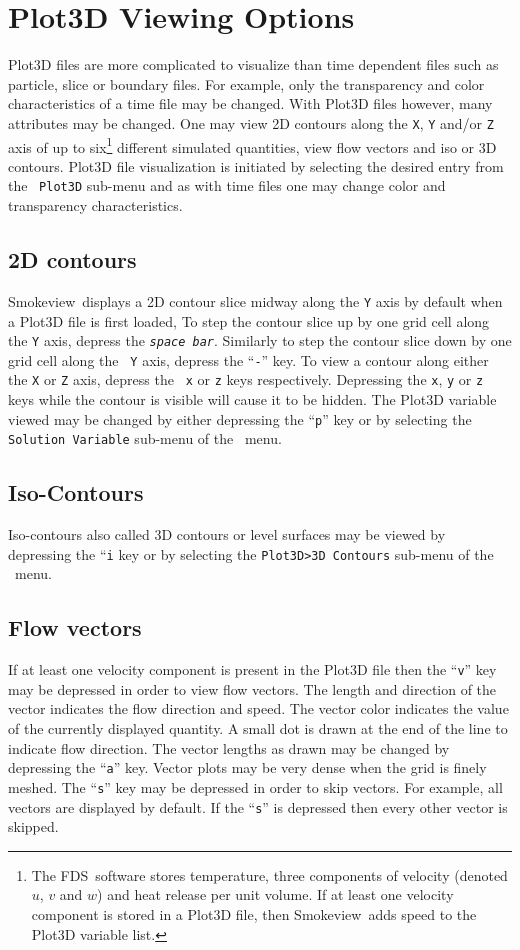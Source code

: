 \documentclass[11pt,twoside]{book}
\newcommand{\fds}{{FDS}}
\newcommand{\Smokeview}{{Smokeview}}
\newcommand{\smokeview}{{Smokeview}}
\newcommand{\loadmenu}{\fbox{\tt Load/Unload} }
\newcommand{\showmenu}{\fbox{\tt Show/Hide} }
\begin{document}
\section{Plot3D Viewing Options} Plot3D files are more
complicated to visualize than time dependent files such as
particle, slice or boundary files. For example, only the
transparency and color characteristics of a time file may be
changed. With Plot3D files however, many attributes may be
changed. One may view 2D contours along the {\tt X}, {\tt Y}
and/or {\tt Z} axis of up to six\footnote{ The \fds\ software
stores temperature, three components of velocity (denoted $u$, $v$
and $w$) and heat release per unit volume.  If at least one
velocity component is stored in a Plot3D file, then \smokeview\
adds speed to the Plot3D variable list.} different simulated
quantities, view flow vectors and iso or 3D contours. Plot3D file
visualization is initiated by selecting the desired entry from the
\loadmenu\ {\tt Plot3D} sub-menu and as with time files one may
change color and transparency characteristics.

\subsection{2D contours}
\Smokeview\ displays a 2D contour slice midway along the
{\tt Y} axis by default when a Plot3D file is first loaded,
To step the contour slice up by one grid cell along the
{\tt Y} axis, depress the {\em\tt space bar}. Similarly to
step the contour slice down by one grid cell along the {\tt
Y} axis, depress the ``{\tt -}'' key. To view a contour
along either the {\tt X} or {\tt Z} axis, depress the {\tt
x} or {\tt z} keys respectively.  Depressing the {\tt x},
{\tt y} or {\tt z} keys while the contour is visible will
cause it to be hidden. The Plot3D variable viewed may be
changed by either depressing the ``{\tt p}'' key or by
selecting the {\tt Solution Variable} sub-menu of the
\showmenu\ menu.

\subsection{Iso-Contours}Iso-contours also called 3D contours or level surfaces may be
viewed by depressing the ``{\tt i} key or by selecting the
{\tt Plot3D>3D Contours} sub-menu of the \showmenu\ menu.

\subsection{Flow vectors}If at least one velocity component is present in the Plot3D
file then the ``{\tt v}'' key may be depressed in order to
view flow  vectors. The length and direction of the vector
indicates the flow direction and speed. The vector color
indicates the value of the currently displayed quantity. A
small dot is drawn at the end of the line to indicate flow
direction. The vector lengths as drawn may be changed by
depressing the ``{\tt a}'' key. Vector plots may be very
dense when the grid is finely meshed. The ``{\tt s}'' key
may be depressed in order to skip vectors.  For example,
all vectors are displayed by default.  If the ``{\tt s}''
is depressed then every other vector is skipped.
\end{document}

